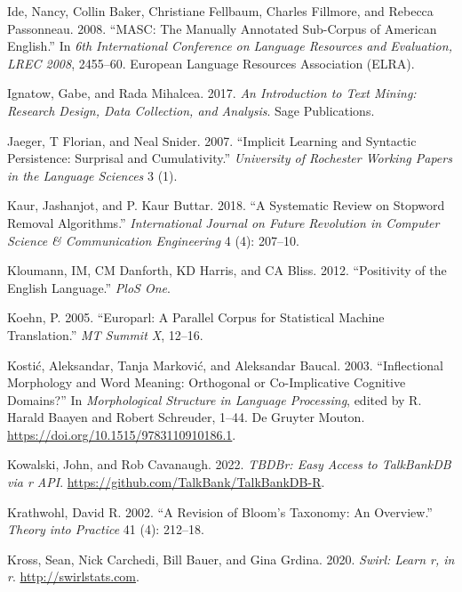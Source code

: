 \documentclass[
  letterpaper,
  DIV=11,
  numbers=noendperiod]{scrreport}
\newlength{\cslhangindent}
\newlength{\cslentryspacingunit} %
\newenvironment{CSLReferences}[2] %
 {%
  \setlength{\parindent}{0pt}
  \ifodd #1
  \let\oldpar\par
  \def\par{\hangindent=\cslhangindent\oldpar}
  \fi
  \setlength{\parskip}{#2\cslentryspacingunit}
 }%
 {}
\theoremstyle{definition}
\theoremstyle{remark}
\begin{document}
\begin{CSLReferences}{1}{0}
\leavevmode{}%
Ide, Nancy, Collin Baker, Christiane Fellbaum, Charles Fillmore, and
Rebecca Passonneau. 2008. {``MASC: The Manually Annotated Sub-Corpus of
American English.''} In \emph{6th International Conference on Language
Resources and Evaluation, LREC 2008}, 2455--60. European Language
Resources Association (ELRA).

\leavevmode{}%
Ignatow, Gabe, and Rada Mihalcea. 2017. \emph{An Introduction to Text
Mining: Research Design, Data Collection, and Analysis}. Sage
Publications.

\leavevmode{}%
Jaeger, T Florian, and Neal Snider. 2007. {``Implicit Learning and
Syntactic Persistence: Surprisal and Cumulativity.''} \emph{University
of Rochester Working Papers in the Language Sciences} 3 (1).

\leavevmode{}%
Kaur, Jashanjot, and P. Kaur Buttar. 2018. {``A Systematic Review on
Stopword Removal Algorithms.''} \emph{International Journal on Future
Revolution in Computer Science \& Communication Engineering} 4 (4):
207--10.

\leavevmode{}%
Kloumann, IM, CM Danforth, KD Harris, and CA Bliss. 2012. {``Positivity
of the English Language.''} \emph{PloS One}.

\leavevmode{}%
Koehn, P. 2005. {``Europarl: A Parallel Corpus for Statistical Machine
Translation.''} \emph{MT Summit X}, 12--16.

\leavevmode{}%
Kostić, Aleksandar, Tanja Marković, and Aleksandar Baucal. 2003.
{``Inflectional Morphology and Word Meaning: Orthogonal or
Co-Implicative Cognitive Domains?''} In \emph{Morphological Structure in
Language Processing}, edited by R. Harald Baayen and Robert Schreuder,
1--44. De Gruyter Mouton. \url{https://doi.org/10.1515/9783110910186.1}.

\leavevmode{}%
Kowalski, John, and Rob Cavanaugh. 2022. \emph{TBDBr: Easy Access to
TalkBankDB via r API}. \url{https://github.com/TalkBank/TalkBankDB-R}.

\leavevmode{}%
Krathwohl, David R. 2002. {``A Revision of Bloom's Taxonomy: An
Overview.''} \emph{Theory into Practice} 41 (4): 212--18.

\leavevmode{}%
Kross, Sean, Nick Carchedi, Bill Bauer, and Gina Grdina. 2020.
\emph{Swirl: Learn r, in r}. \url{http://swirlstats.com}.


\end{CSLReferences}
\end{document}
